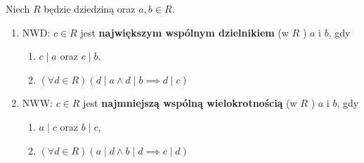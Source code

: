 \begin{definition}
	Niech $R$ będzie dziedziną oraz $a,b \in R$.
	\begin{enumerate}[label=\arabic*)]
		\item NWD: $c\in R$ jest \textbf{największym wspólnym dzielnikiem } (w $R$ ) $a$ i $b$, gdy
			\begin{enumerate}[label=\roman*)]
				\item $c\mid a$ oraz $c\mid b$,
				\item $\left(\forall d\in R \right)\left( d\mid a \land d\mid b \implies d\mid c \right)  $
			\end{enumerate}
		\item NWW: $c\in R$ jest \textbf{najmniejszą wspólną wielokrotnością} (w $R$ ) $a$ i $b$, gdy
			\begin{enumerate}[label=\roman*)]
				\item $a\mid c$ oraz $b\mid c$,
				\item $\left(\forall d\in R \right)\left( a\mid d \land b\mid d \implies c\mid d \right)  $
			\end{enumerate}
	\end{enumerate}
\end{definition} 

